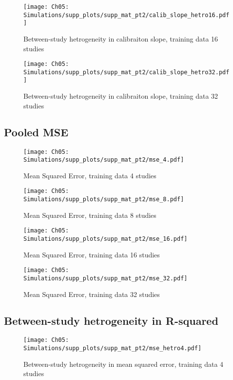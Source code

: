 \begin{figure}[H]
  \centering
  \texttt{[image: Ch05: Simulations/supp\_plots/supp\_mat\_pt2/calib\_slope\_hetro16.pdf]}
  \caption{Between-study hetrogeneity in calibraiton slope, training data 16 studies}
\end{figure}

\begin{figure}[H]
  \centering
  \texttt{[image: Ch05: Simulations/supp\_plots/supp\_mat\_pt2/calib\_slope\_hetro32.pdf]}
  \caption{Between-study hetrogeneity in calibraiton slope, training data 32 studies}
\end{figure}

\subsection{Pooled MSE}
\begin{figure}[H]
  \centering
  \texttt{[image: Ch05: Simulations/supp\_plots/supp\_mat\_pt2/mse\_4.pdf]}
  \caption{Mean Squared Error, training data 4 studies}
\end{figure}

\begin{figure}[H]
  \centering
  \texttt{[image: Ch05: Simulations/supp\_plots/supp\_mat\_pt2/mse\_8.pdf]}
  \caption{Mean Squared Error, training data 8 studies}
\end{figure}

\begin{figure}[H]
  \centering
  \texttt{[image: Ch05: Simulations/supp\_plots/supp\_mat\_pt2/mse\_16.pdf]}
  \caption{Mean Squared Error, training data 16 studies}
\end{figure}

\begin{figure}[H]
  \centering
  \texttt{[image: Ch05: Simulations/supp\_plots/supp\_mat\_pt2/mse\_32.pdf]}
  \caption{Mean Squared Error, training data 32 studies}
\end{figure}

\subsection{Between-study hetrogeneity in R-squared}
\begin{figure}[H]
  \centering
  \texttt{[image: Ch05: Simulations/supp\_plots/supp\_mat\_pt2/mse\_hetro4.pdf]}
  \caption{Between-study hetrogeneity in mean squared error, training data 4 studies}
\end{figure}

